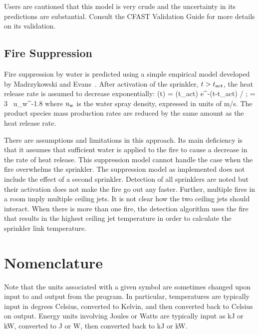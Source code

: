 \documentclass[12pt]{book}
\begin{document}
Users are cautioned that this model is very crude and the uncertainty in its predictions are substantial. Consult the CFAST Validation Guide for more details on its validation.


\section{Fire Suppression} \label{sec:suppression}

Fire suppression by water is predicted using a simple empirical model developed by Madrzykowski \cite{Madrzykowski:1992} and Evans~\cite{Evans:1993}. After activation of the sprinkler, $t > t_{\rm act}$, the heat release rate is assumed to decrease exponentially:
\be
   \dQ(t) = \dQ(t_{\rm act}) \; {\rm e}^{-(t-t_{\rm act}) /\tau}   \quad ; \quad \tau = 3 \, u_{\rm w}^{-1.8}
\ee
where $u_{\rm w}$ is the water spray density, expressed in units of m/s. The product species mass production rates are reduced by the same amount as the heat release rate.

There are assumptions and limitations in this approach. Its main deficiency is that it assumes that sufficient water is applied to the fire to cause a decrease in the rate of heat release. This suppression model cannot handle the case when the fire overwhelms the sprinkler.  The suppression model as implemented does not include the effect of a second sprinkler. Detection of all sprinklers are noted but their activation does not make the fire go out any faster. Further, multiple fires in a room imply multiple ceiling jets. It is not clear how the two ceiling jets should interact. When there is more than one fire, the detection algorithm uses the fire that results in the highest ceiling jet temperature in order to calculate the sprinkler link temperature.




\backmatter

\chapter{Nomenclature}
\label{nomenclature}

Note that the units associated with a given symbol are sometimes changed upon input to and output from the program. In particular, temperatures are typically input in degrees Celsius, converted to Kelvin, and then converted back to Celsius on output. Energy units involving Joules or Watts are typically input as kJ or kW, converted to J or W, then converted back to kJ or kW.
\end{document}
